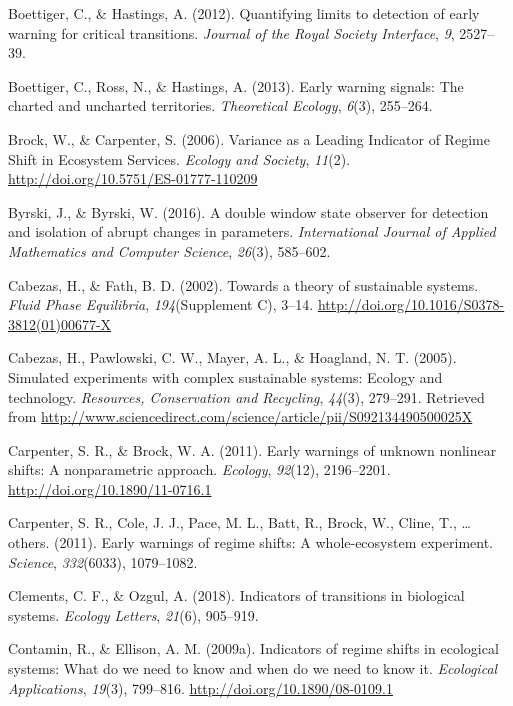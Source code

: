 \documentclass[12pt,twoside,openany]{reedthesis}
\begin{document}
\hypertarget{ref-boettiger_quantifying_2012}{}
Boettiger, C., \& Hastings, A. (2012). Quantifying limits to detection
of early warning for critical transitions. \emph{Journal of the Royal
Society Interface}, \emph{9}, 2527--39.

\hypertarget{ref-boettiger_early_2013}{}
Boettiger, C., Ross, N., \& Hastings, A. (2013). Early warning signals:
The charted and uncharted territories. \emph{Theoretical Ecology},
\emph{6}(3), 255--264.

\hypertarget{ref-brock_variance_2006}{}
Brock, W., \& Carpenter, S. (2006). Variance as a Leading Indicator of
Regime Shift in Ecosystem Services. \emph{Ecology and Society},
\emph{11}(2). \url{http://doi.org/10.5751/ES-01777-110209}

\hypertarget{ref-byrski2016double}{}
Byrski, J., \& Byrski, W. (2016). A double window state observer for
detection and isolation of abrupt changes in parameters.
\emph{International Journal of Applied Mathematics and Computer
Science}, \emph{26}(3), 585--602.

\hypertarget{ref-cabezas_towards_2002}{}
Cabezas, H., \& Fath, B. D. (2002). Towards a theory of sustainable
systems. \emph{Fluid Phase Equilibria}, \emph{194}(Supplement C), 3--14.
\url{http://doi.org/10.1016/S0378-3812(01)00677-X}

\hypertarget{ref-cabezas_simulated_2005}{}
Cabezas, H., Pawlowski, C. W., Mayer, A. L., \& Hoagland, N. T. (2005).
Simulated experiments with complex sustainable systems: Ecology and
technology. \emph{Resources, Conservation and Recycling}, \emph{44}(3),
279--291. Retrieved from
\url{http://www.sciencedirect.com/science/article/pii/S092134490500025X}

\hypertarget{ref-carpenter_early_2011}{}
Carpenter, S. R., \& Brock, W. A. (2011). Early warnings of unknown
nonlinear shifts: A nonparametric approach. \emph{Ecology},
\emph{92}(12), 2196--2201. \url{http://doi.org/10.1890/11-0716.1}

\hypertarget{ref-carpenter2011early}{}
Carpenter, S. R., Cole, J. J., Pace, M. L., Batt, R., Brock, W., Cline,
T., \ldots{} others. (2011). Early warnings of regime shifts: A
whole-ecosystem experiment. \emph{Science}, \emph{332}(6033),
1079--1082.

\hypertarget{ref-clements2018indicators}{}
Clements, C. F., \& Ozgul, A. (2018). Indicators of transitions in
biological systems. \emph{Ecology Letters}, \emph{21}(6), 905--919.

\hypertarget{ref-contamin_indicators_2009}{}
Contamin, R., \& Ellison, A. M. (2009a). Indicators of regime shifts in
ecological systems: What do we need to know and when do we need to know
it. \emph{Ecological Applications}, \emph{19}(3), 799--816.
\url{http://doi.org/10.1890/08-0109.1}
\end{document}
